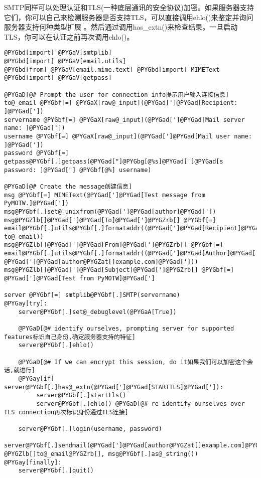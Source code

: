 \documentclass[letterpaper,10pt,english]{manual}
\begin{document}
SMTP同样可以处理认证和TLS(一种底层通讯的安全协议)加密。如果服务器支持它们，你可以自己来检测服务器是否支持TLS，可以直接调用ehlo()来鉴定并询问服务器支持何种类型扩展 。然后通过调用has\_extn()来检查结果。一旦启动TLS，你可以在认证之前再次调用ehlo()。

\begin{Verbatim}[commandchars=@\[\]]
@PYGbd[import] @PYGaV[smtplib]
@PYGbd[import] @PYGaV[email.utils]
@PYGbd[from] @PYGaV[email.mime.text] @PYGbd[import] MIMEText
@PYGbd[import] @PYGaV[getpass]

@PYGaD[@# Prompt the user for connection info提示用户输入连接信息]
to@_email @PYGbf[=] @PYGaX[raw@_input](@PYGad[']@PYGad[Recipient: ]@PYGad['])
servername @PYGbf[=] @PYGaX[raw@_input](@PYGad[']@PYGad[Mail server name: ]@PYGad['])
username @PYGbf[=] @PYGaX[raw@_input](@PYGad[']@PYGad[Mail user name: ]@PYGad['])
password @PYGbf[=] getpass@PYGbf[.]getpass(@PYGad["]@PYGbg[@%s]@PYGad[']@PYGad[s password: ]@PYGad["] @PYGbf[@%] username)

@PYGaD[@# Create the message创建信息]
msg @PYGbf[=] MIMEText(@PYGad[']@PYGad[Test message from PyMOTW.]@PYGad['])
msg@PYGbf[.]set@_unixfrom(@PYGad[']@PYGad[author]@PYGad['])
msg@PYGZlb[]@PYGad[']@PYGad[To]@PYGad[']@PYGZrb[] @PYGbf[=] email@PYGbf[.]utils@PYGbf[.]formataddr((@PYGad[']@PYGad[Recipient]@PYGad['], to@_email))
msg@PYGZlb[]@PYGad[']@PYGad[From]@PYGad[']@PYGZrb[] @PYGbf[=] email@PYGbf[.]utils@PYGbf[.]formataddr((@PYGad[']@PYGad[Author]@PYGad['], @PYGad[']@PYGad[author@PYGZat[]example.com]@PYGad[']))
msg@PYGZlb[]@PYGad[']@PYGad[Subject]@PYGad[']@PYGZrb[] @PYGbf[=] @PYGad[']@PYGad[Test from PyMOTW]@PYGad[']

server @PYGbf[=] smtplib@PYGbf[.]SMTP(servername)
@PYGay[try]:
    server@PYGbf[.]set@_debuglevel(@PYGaA[True])

    @PYGaD[@# identify ourselves, prompting server for supported features标识自己身份,确定服务器支持的特征]
    server@PYGbf[.]ehlo()

    @PYGaD[@# If we can encrypt this session, do it如果我们可以加密这个会话,就进行]
    @PYGay[if] server@PYGbf[.]has@_extn(@PYGad[']@PYGad[STARTTLS]@PYGad[']):
         server@PYGbf[.]starttls()
         server@PYGbf[.]ehlo() @PYGaD[@# re-identify ourselves over TLS connection再次标识身份通过TLS连接]

    server@PYGbf[.]login(username, password)
    server@PYGbf[.]sendmail(@PYGad[']@PYGad[author@PYGZat[]example.com]@PYGad['], @PYGZlb[]to@_email@PYGZrb[], msg@PYGbf[.]as@_string())
@PYGay[finally]:
    server@PYGbf[.]quit()
\end{Verbatim}
\end{document}
